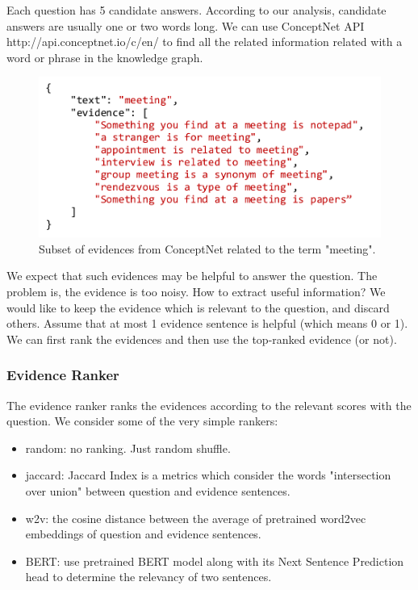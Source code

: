 \documentclass[letterpaper]{article} %
\begin{document}
Each question has 5 candidate answers. According to our analysis, candidate answers are usually one or two words long. We can use ConceptNet API http://api.conceptnet.io/c/en/ to find all the related information related with a word or phrase in the knowledge graph.

\begin{figure}[t!]
  \centering
  \includegraphics[width=\columnwidth]{evidencefinding.pdf}
  \caption{Subset of evidences from ConceptNet related to the term "meeting".}
  \label{fig:evidencefinding}
\end{figure}

We expect that such evidences may be helpful to answer the question. The problem is, the evidence is too noisy. How to extract useful information? We would like to keep the evidence which is relevant to the question, and discard others. Assume that at most 1 evidence sentence is helpful (which means 0 or 1). We can first rank the evidences and then use the top-ranked evidence (or not).

\subsubsection{Evidence Ranker}

The evidence ranker ranks the evidences according to the relevant scores with the question. We consider some of the very simple rankers:

\begin{itemize}
	\item random: no ranking. Just random shuffle.
	\item jaccard: Jaccard Index is a metrics which consider the words "intersection over union" between question and evidence sentences.
	\item w2v: the cosine distance between the average of pretrained word2vec embeddings of question and evidence sentences.
	\item BERT: use pretrained BERT model along with its Next Sentence Prediction head to determine the relevancy of two sentences.
\end{itemize}
\end{document}
